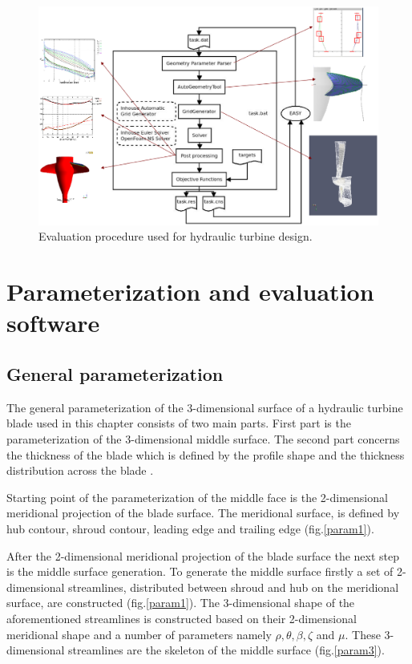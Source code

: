 \begin{figure}[h!]
\centering
\includegraphics[width=150mm]{eval.eps} 
\caption{Evaluation procedure used for hydraulic turbine design.}
\label{evaltool}
\end{figure}      
      
\section{Parameterization and evaluation software}
\label{ParamEval}
\subsection{General parameterization}
\label{Paramt}
The general parameterization of the 3-dimensional surface of a hydraulic turbine blade used in this chapter consists of two main parts. First part is the parameterization of the 3-dimensional middle surface. The second part concerns the thickness of the blade which is defined by the profile shape and the thickness distribution across the blade \cite{dipl_livia,dipl_simon}.

Starting point of the parameterization of the middle face is the 2-dimensional meridional projection of the blade surface. The meridional surface, is defined by hub contour, shroud contour, leading edge and trailing edge (fig.\ref{param1}). 



After the 2-dimensional meridional projection of the blade surface the next step is the middle surface generation. To generate the middle surface firstly a set of 2-dimensional streamlines, distributed between shroud and hub on the meridional surface, are constructed (fig.\ref{param1}). The 3-dimensional shape of the aforementioned streamlines is constructed based on their 2-dimensional meridional shape and a number of parameters namely $\rho,\theta,\beta,\zeta$ and $\mu$. These 3-dimensional streamlines are the skeleton of the middle surface (fig.\ref{param3}).

